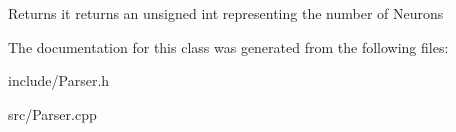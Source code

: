 \begin{DoxyReturn}{Returns}
it returns an unsigned int representing the number of Neurons 
\end{DoxyReturn}


The documentation for this class was generated from the following files\-:\begin{DoxyCompactItemize}
\item 
include/Parser.\-h\item 
src/Parser.\-cpp\end{DoxyCompactItemize}
